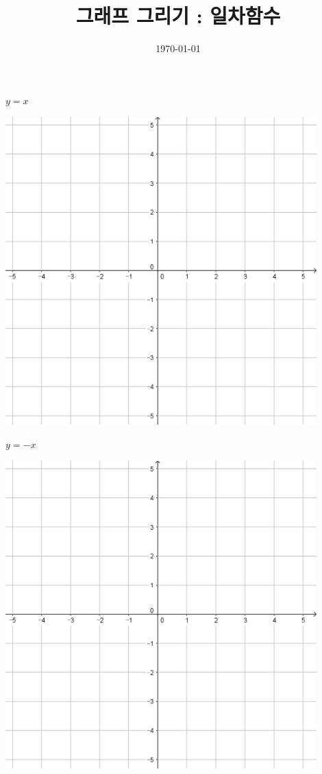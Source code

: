 \documentclass[a4paper]{oblivoir}
\title{그래프 그리기 : 일차함수}
\date{\today}
\author{}
\begin{document}
\maketitle

\begin{minipage}{0.45\textwidth}\centering
\(y=x\)
\par\bigskip\includegraphics[width=0.9\textwidth]{55}
\end{minipage}
\begin{minipage}{0.45\textwidth}\centering
\(y=-x\)
\par\bigskip\includegraphics[width=0.9\textwidth]{55}
\end{minipage}\bigskip\bigskip\par
\end{document}
